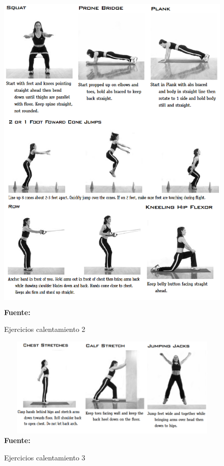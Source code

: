 \begin{figure}[H]
	\caption{Ejercicios calentamiento 2}
	\label{fig:anxWarmup2}
	\centering
	\includegraphics[width=430px,height=600px]{graphics/warmup2.PNG} \\
	\textbf{Fuente:} \cite{arbour2006strength}
\end{figure}

\begin{figure}[H]
	\caption{Ejercicios calentamiento 3}
	\label{fig:anxWarmup3}
	\centering
	\includegraphics[width=430px,height=180px]{graphics/warmup3.PNG} \\
	\textbf{Fuente:} \cite{arbour2006strength}
\end{figure}

